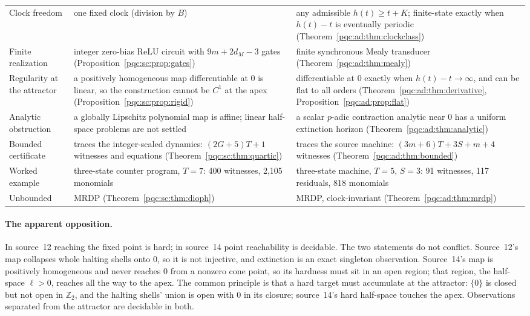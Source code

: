 \documentclass[11pt,letterpaper]{article}
\numberwithin{equation}{section}
\theoremstyle{definition}
\theoremstyle{remark}
\newcommand{\Ztwo}{\mathbb Z_2}
\begin{document}
\begin{center}
\begin{tabularx}{\textwidth}{@{}>{\raggedright\arraybackslash}p{}>{\raggedright\arraybackslash}X>{\raggedright\arraybackslash}X@{}}
Clock freedom & one fixed clock (division by $B$) & any admissible $h(t)\ge t+K$; finite-state exactly when $h(t)-t$ is eventually periodic (Theorem~\ref{pqc:ad:thm:clockclass})\\
Finite realization & integer zero-bias ReLU circuit with $9m+2d_M-3$ gates (Proposition~\ref{pqc:sc:prop:gates}) & finite synchronous Mealy transducer (Theorem~\ref{pqc:ad:thm:mealy})\\
Regularity at the attractor & a positively homogeneous map differentiable at $0$ is linear, so the construction cannot be $C^1$ at the apex (Proposition~\ref{pqc:sc:prop:rigid}) & differentiable at $0$ exactly when $h(t)-t\to\infty$, and can be flat to all orders (Theorem~\ref{pqc:ad:thm:derivative}, Proposition~\ref{pqc:ad:prop:flat})\\
Analytic obstruction & a globally Lipschitz polynomial map is affine; linear half-space problems are not settled & a scalar $p$-adic contraction analytic near $0$ has a uniform extinction horizon (Theorem~\ref{pqc:ad:thm:analytic})\\
Bounded certificate & traces the integer-scaled dynamics: $(2G+5)T+1$ witnesses and equations (Theorem~\ref{pqc:sc:thm:quartic}) & traces the source machine: $(3m+6)T+3S+m+4$ witnesses (Theorem~\ref{pqc:ad:thm:bounded})\\
Worked example & three-state counter program, $T=7$: 400 witnesses, 2,105 monomials & three-state machine, $T=5$, $S=3$: 91 witnesses, 117 residuals, 818 monomials\\
Unbounded & MRDP (Theorem~\ref{pqc:sc:thm:dioph}) & MRDP, clock-invariant (Theorem~\ref{pqc:ad:thm:mrdp})\\
\bottomrule
\end{tabularx}
\end{center}

\paragraph{The apparent opposition.}
In source~12 reaching the fixed point is hard; in source~14 point reachability is
decidable. The two statements do not conflict. Source~12's map collapses whole
halting shells onto $0$, so it is not injective, and extinction is an exact
singleton observation. Source~14's map is positively homogeneous and never
reaches $0$ from a nonzero cone point, so its hardness must sit in an open region;
that region, the half-space $\ell>0$, reaches all the way to the apex. The common
principle is that a hard target must accumulate at the attractor: $\{0\}$ is
closed but not open in $\Ztwo$, and the halting shells' union is open with $0$ in
its closure; source~14's hard half-space touches the apex. Observations separated
from the attractor are decidable in both.
\end{document}

